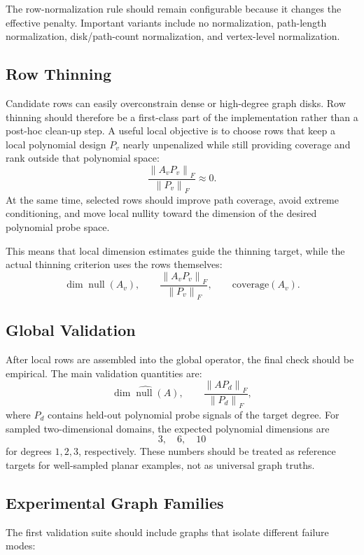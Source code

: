 \documentclass[11pt]{article}
\newcommand{\norm}[1]{\left\lVert #1 \right\rVert}
\newcommand{\nullsp}{\operatorname{null}}
\begin{document}
The row-normalization rule should remain configurable because it changes the
effective penalty.  Important variants include no normalization, path-length
normalization, disk/path-count normalization, and vertex-level normalization.

\subsection{Row Thinning}

Candidate rows can easily overconstrain dense or high-degree graph disks.  Row
thinning should therefore be a first-class part of the implementation rather
than a post-hoc clean-up step.  A useful local objective is to choose rows that
keep a local polynomial design \(P_v\) nearly unpenalized while still providing
coverage and rank outside that polynomial space:
\[
  \frac{\norm{A_vP_v}_F}{\norm{P_v}_F}
  \approx 0.
\]
At the same time, selected rows should improve path coverage, avoid extreme
conditioning, and move local nullity toward the dimension of the desired
polynomial probe space.

This means that local dimension estimates guide the thinning target, while the
actual thinning criterion uses the rows themselves:
\[
  \dim\nullsp(A_v),
  \qquad
  \frac{\norm{A_vP_v}_F}{\norm{P_v}_F},
  \qquad
  \text{coverage}(A_v).
\]

\subsection{Global Validation}

After local rows are assembled into the global operator, the final check should
be empirical.  The main validation quantities are:
\[
  \widehat{\dim\nullsp(A)},
  \qquad
  \frac{\norm{AP_d}_F}{\norm{P_d}_F},
\]
where \(P_d\) contains held-out polynomial probe signals of the target degree.
For sampled two-dimensional domains, the expected polynomial dimensions are
\[
  3,\quad 6,\quad 10
\]
for degrees \(1,2,3\), respectively.  These numbers should be treated as
reference targets for well-sampled planar examples, not as universal graph
truths.

\subsection{Experimental Graph Families}

The first validation suite should include graphs that isolate different
failure modes:
\end{document}
